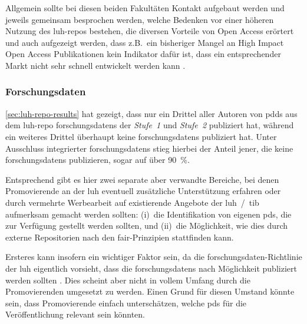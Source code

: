 Allgemein sollte bei diesen beiden Fakultäten Kontakt aufgebaut werden und jeweils gemeinsam besprochen werden, welche Bedenken vor einer höheren Nutzung des \gls{luh-repo}s bestehen, die diversen Vorteile von Open Access erörtert \autocite{Bautista-Puig2020} und auch aufgezeigt werden, dass z.B.~ein bisheriger Mangel an High Impact Open Access Publikationen kein Indikator dafür ist, dass ein entsprechender Markt nicht sehr schnell entwickelt werden kann \autocite{Björk2012}.

\subsubsection{Forschungsdaten}
\cref{sec:luh-repo-results} hat gezeigt, dass nur ein Drittel aller Autoren von \glspl{pdd} aus dem \gls{luh-repo} \glspl{forschungsdaten} der \textit{Stufe~1} und \textit{Stufe~2} publiziert hat, während ein weiteres Drittel überhaupt keine \glspl{forschungsdaten} publiziert hat.
Unter Ausschluss integrierter \glspl{forschungsdaten} stieg hierbei der Anteil jener, die keine \glspl{forschungsdaten} publizieren, sogar auf über \SI{90}{\percent}.

Entsprechend gibt es hier zwei separate aber verwandte Bereiche, bei denen Promovierende an der \gls{luh} eventuell zusätzliche Unterstützung erfahren oder durch vermehrte Werbearbeit auf existierende Angebote der \gls{luh}~/~\gls{tib} aufmerksam gemacht werden sollten:
(i)~die Identifikation von eigenen \glspl{pd}, die zur Verfügung gestellt werden sollten, und (ii)~die Möglichkeit, wie dies durch externe Repositorien nach den \gls{fair}-Prinzipien stattfinden kann.

Ersteres kann insofern ein wichtiger Faktor sein, da die \gls{forschungsdaten}-Richtlinie der \gls{luh} eigentlich vorsieht, dass die \glspl{forschungsdaten} nach Möglichkeit publiziert werden sollten \autocite{luhfdm-richtlinie}.
Dies scheint aber nicht in vollem Umfang durch die Promovierenden umgesetzt zu werden.
Einen Grund für diesen Umstand könnte sein, dass Promovierende einfach unterschätzen, welche \glspl{pd} für die Veröffentlichung relevant sein könnten.

